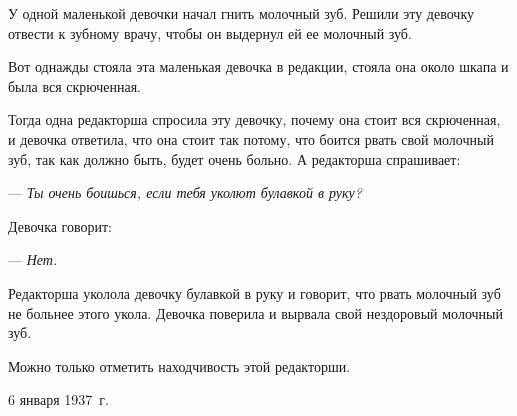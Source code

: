 У одной маленькой девочки начал гнить молочный зуб. Решили эту девочку отвести к зубному врачу, чтобы он выдернул ей ее молочный зуб.

Вот однажды стояла эта маленькая девочка в редакции, стояла она около шкапа и была вся скрюченная.

Тогда одна редакторша спросила эту девочку, почему она стоит вся скрюченная, и девочка ответила, что она стоит так потому, что боится рвать свой молочный зуб, так как должно быть, будет очень больно. А редакторша спрашивает:

--- \textit{Ты очень боишься, если тебя уколют булавкой в руку?}

Девочка говорит:

--- \textit{Нет.}

Редакторша уколола девочку булавкой в руку и говорит, что рвать молочный зуб не больнее этого укола. Девочка поверила и вырвала свой нездоровый молочный зуб.

Можно только отметить находчивость этой редакторши.

\begin{flushright}
6 января 1937~г.
\end{flushright}
